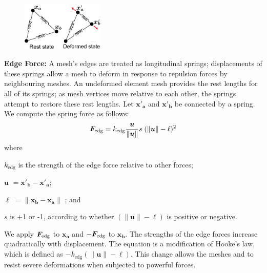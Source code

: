 \begin{figure}
\vspace{-15pt}
    \includegraphics[width=0.35\textwidth]{figures/repulsionpak/edge_forces.pdf}
\end{figure}
\textbf{Edge Force:} 
A mesh's edges are treated as longitudinal springs;
displacements of these springs allow a mesh to deform in response to repulsion forces
by neighbouring meshes.
An undeformed element mesh provides the rest lengths for all of
its springs; as mesh vertices move relative to each other, the springs
attempt to restore these rest lengths.  Let $\bm{x'_{a}}$ and $\bm{x'_{b}}$ be
 connected by a spring.  We compute the spring force as follows:
\begin{equation}
\label{eq_edge_force}
\bm{F}_\mathrm{edg} =  k_\mathrm{edg} \frac{\bm{u}}{\| \bm{u} \|} s \; ( \| \bm{u} \| - \ell)^2
\end{equation}
where
\begin{packeddescriptions}
	\item[$k_\mathrm{edg}$] is the strength of the edge force relative to other forces;
	\item[$\bm{u}$] $= \bm{x'_{b}} - \bm{x'_{a}}$;
	\item[$\ell$] $= \|\bm{x_{b}} - \bm{x_{a}}\|$ ; and
	\item[$s$] is +1 or -1, according to whether $(\| \bm{u} \| - \ell)$ 
		is positive or negative.
\end{packeddescriptions}


We apply $\bm{F}_\mathrm{edg}$ to $\bm{x_{a}}$ and $-\bm{F}_\mathrm{edg}$ to $\bm{x_{b}}$.
\nnewtext
{
The strengths of the edge forces increase quadratically with displacement.
The equation is a modification of Hooke's law, which is defined as $-k_\mathrm{edg}( \| \bm{u} \| - \ell)$.
}
This change allows the meshes  and 
to resist severe deformations when subjected to powerful forces.


